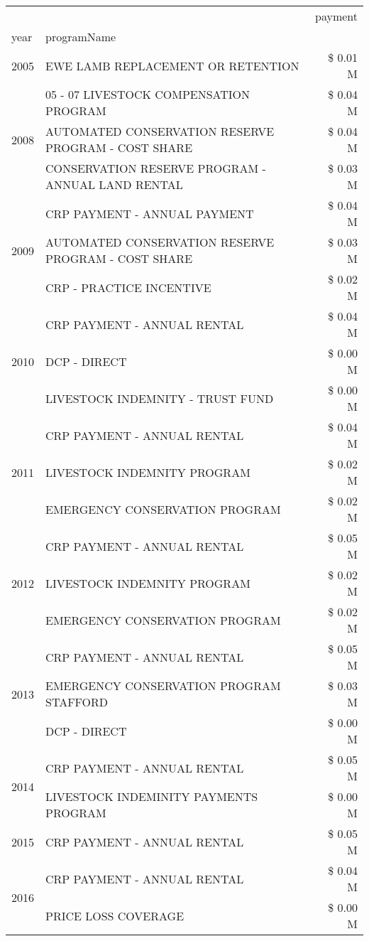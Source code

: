 \begin{tabular}{llr}
\toprule
 &  & payment \\
year & programName &  \\
\midrule
2005 & EWE LAMB REPLACEMENT OR RETENTION & \$ 0.01 M \\
\cline{1-3}
\multirow[t]{3}{*}{2008} & 05 - 07 LIVESTOCK COMPENSATION PROGRAM & \$ 0.04 M \\
 & AUTOMATED CONSERVATION RESERVE PROGRAM - COST SHARE & \$ 0.04 M \\
 & CONSERVATION RESERVE PROGRAM - ANNUAL LAND RENTAL & \$ 0.03 M \\
\cline{1-3}
\multirow[t]{3}{*}{2009} & CRP PAYMENT - ANNUAL PAYMENT & \$ 0.04 M \\
 & AUTOMATED CONSERVATION RESERVE PROGRAM - COST SHARE & \$ 0.03 M \\
 & CRP - PRACTICE INCENTIVE & \$ 0.02 M \\
\cline{1-3}
\multirow[t]{3}{*}{2010} & CRP PAYMENT - ANNUAL RENTAL & \$ 0.04 M \\
 & DCP - DIRECT & \$ 0.00 M \\
 & LIVESTOCK INDEMNITY - TRUST FUND & \$ 0.00 M \\
\cline{1-3}
\multirow[t]{3}{*}{2011} & CRP PAYMENT - ANNUAL RENTAL & \$ 0.04 M \\
 & LIVESTOCK INDEMNITY PROGRAM & \$ 0.02 M \\
 & EMERGENCY CONSERVATION PROGRAM & \$ 0.02 M \\
\cline{1-3}
\multirow[t]{3}{*}{2012} & CRP PAYMENT - ANNUAL RENTAL & \$ 0.05 M \\
 & LIVESTOCK INDEMNITY PROGRAM & \$ 0.02 M \\
 & EMERGENCY CONSERVATION PROGRAM & \$ 0.02 M \\
\cline{1-3}
\multirow[t]{3}{*}{2013} & CRP PAYMENT - ANNUAL RENTAL & \$ 0.05 M \\
 & EMERGENCY CONSERVATION PROGRAM STAFFORD & \$ 0.03 M \\
 & DCP - DIRECT & \$ 0.00 M \\
\cline{1-3}
\multirow[t]{2}{*}{2014} & CRP PAYMENT - ANNUAL RENTAL & \$ 0.05 M \\
 & LIVESTOCK INDEMINITY PAYMENTS PROGRAM & \$ 0.00 M \\
\cline{1-3}
2015 & CRP PAYMENT - ANNUAL RENTAL & \$ 0.05 M \\
\cline{1-3}
\multirow[t]{3}{*}{2016} & CRP PAYMENT - ANNUAL RENTAL & \$ 0.04 M \\
 & PRICE LOSS COVERAGE & \$ 0.00 M \\

\end{tabular}
